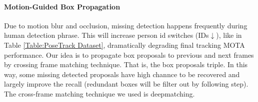 \documentclass{bmvc2k}
\begin{document}
\paragraph{Motion-Guided Box Propagation} Due to motion blur and occlusion, missing detection happens frequently during human detection phrase. This will increase person id switches (IDs$\downarrow$), like in Table \ref{Table:PoseTrack Dataset},  dramatically degrading final tracking MOTA performance. Our idea is to propagate box proposals to previous and next frames by crossing frame matching technique. That is, the box proposals triple. In this way, some missing detected proposals have high channce to be recovered and largely improve the recall (redundant boxes will be filter out by following step). The cross-frame matching technique we used is deepmatching\cite{revaud2016deepmatching}.
\vspace{-3mm}
\end{document}

